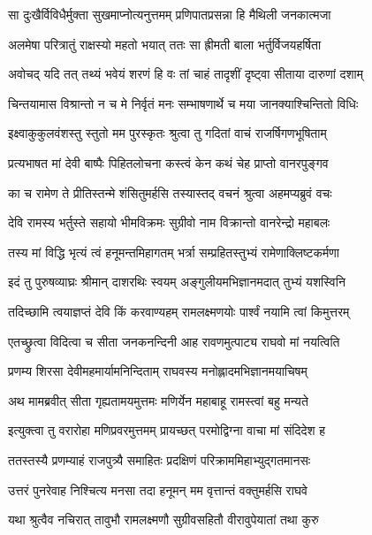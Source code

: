 \twolineshloka
{सा दुःखैर्विविधैर्मुक्ता सुखमाप्नोत्यनुत्तमम्}
{प्रणिपातप्रसन्ना हि मैथिली जनकात्मजा} %

\twolineshloka
{अलमेषा परित्रातुं राक्षस्यो महतो भयात्}
{ततः सा ह्रीमती बाला भर्तुर्विजयहर्षिता} %

\twolineshloka
{अवोचद् यदि तत् तथ्यं भवेयं शरणं हि वः}
{तां चाहं तादृशीं दृष्ट्वा सीताया दारुणां दशाम्} %

\twolineshloka
{चिन्तयामास विश्रान्तो न च मे निर्वृतं मनः}
{सम्भाषणार्थे च मया जानक्याश्चिन्तितो विधिः} %

\twolineshloka
{इक्ष्वाकुकुलवंशस्तु स्तुतो मम पुरस्कृतः}
{श्रुत्वा तु गदितां वाचं राजर्षिगणभूषिताम्} %

\twolineshloka
{प्रत्यभाषत मां देवी बाष्पैः पिहितलोचना}
{कस्त्वं केन कथं चेह प्राप्तो वानरपुङ्गव} %

\twolineshloka
{का च रामेण ते प्रीतिस्तन्मे शंसितुमर्हसि}
{तस्यास्तद् वचनं श्रुत्वा अहमप्यब्रुवं वचः} %

\twolineshloka
{देवि रामस्य भर्तुस्ते सहायो भीमविक्रमः}
{सुग्रीवो नाम विक्रान्तो वानरेन्द्रो महाबलः} %

\twolineshloka
{तस्य मां विद्धि भृत्यं त्वं हनूमन्तमिहागतम्}
{भर्त्रा सम्प्रहितस्तुभ्यं रामेणाक्लिष्टकर्मणा} %

\twolineshloka
{इदं तु पुरुषव्याघ्रः श्रीमान् दाशरथिः स्वयम्}
{अङ्गुलीयमभिज्ञानमदात् तुभ्यं यशस्विनि} %

\twolineshloka
{तदिच्छामि त्वयाज्ञप्तं देवि किं करवाण्यहम्}
{रामलक्ष्मणयोः पार्श्वं नयामि त्वां किमुत्तरम्} %

\twolineshloka
{एतच्छ्रुत्वा विदित्वा च सीता जनकनन्दिनी}
{आह रावणमुत्पाट्य राघवो मां नयत्विति} %

\twolineshloka
{प्रणम्य शिरसा देवीमहमार्यामनिन्दिताम्}
{राघवस्य मनोह्लादमभिज्ञानमयाचिषम्} %

\twolineshloka
{अथ मामब्रवीत् सीता गृह्यतामयमुत्तमः}
{मणिर्येन महाबाहू रामस्त्वां बहु मन्यते} %

\twolineshloka
{इत्युक्त्वा तु वरारोहा मणिप्रवरमुत्तमम्}
{प्रायच्छत् परमोद्विग्ना वाचा मां संदिदेश ह} %

\twolineshloka
{ततस्तस्यै प्रणम्याहं राजपुत्र्यै समाहितः}
{प्रदक्षिणं परिक्राममिहाभ्युद्गतमानसः} %

\twolineshloka
{उत्तरं पुनरेवाह निश्चित्य मनसा तदा}
{हनूमन् मम वृत्तान्तं वक्तुमर्हसि राघवे} %

\twolineshloka
{यथा श्रुत्वैव नचिरात् तावुभौ रामलक्ष्मणौ}
{सुग्रीवसहितौ वीरावुपेयातां तथा कुरु} %

